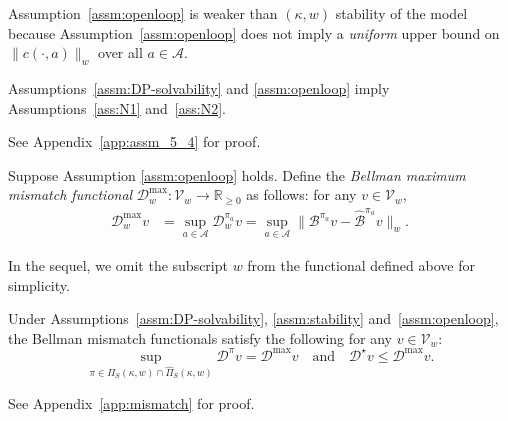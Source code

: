 \documentclass[letterpaper, 10pt]{IEEEtran}
\newcommand*\ALPHABET{\mathcal}
\newcommand*\reals{\mathds{R}}
\newcommand*\BELLMAN{\mathscr{B}}
\newcommand*\MISMATCH{\mathscr{D}}
\newcommand*\tuple{\kappa, w}
\begin{document}
Assumption~\ref{assm:openloop} is weaker than $(\kappa, w)$ stability of the model because Assumption~\ref{assm:openloop} does not imply a \emph{uniform} upper bound on $\| c(\cdot,a)\|_w$ over all $a \in \ALPHABET A$.

\begin{lemma}\label{lem:assm_5_4}
    Assumptions~\ref{assm:DP-solvability} and \ref{assm:openloop} imply Assumptions~\ref{ass:N1} and~\ref{ass:N2}.
\end{lemma}
See Appendix~\ref{app:assm_5_4} for proof.

 \begin{definition}\label{def:openloop}
     Suppose Assumption \ref{assm:openloop} holds. Define the \emph{Bellman maximum mismatch functional} $\MISMATCH^{\max}_w \colon \ALPHABET V_w \to \reals_{\ge 0}$  as follows: for any $v \in \ALPHABET V_w$, 
     \begin{align*}
         \MISMATCH_w^{\max}v 
         &= \sup_{a \in \ALPHABET A} \MISMATCH^{\pi_a}_w v
         = \sup_{a \in  \ALPHABET A} \| \BELLMAN^{\pi_a}v - \hat{\BELLMAN}^{\pi_a}v \|_w .
     \end{align*}
\end{definition}
In the sequel, we omit the subscript $w$ from the functional defined above for simplicity.

 \begin{lemma}\label{lem:mismatch}
    Under Assumptions~\ref{assm:DP-solvability}, \ref{assm:stability} and~\ref{assm:openloop}, the  Bellman mismatch functionals satisfy the following for any $v \in \ALPHABET V_w$:
        \begin{equation}\label{eq:mismatch-reln}
            \sup_{\pi \in \Pi_S(\tuple) \cap \hat \Pi_S(\tuple)} \MISMATCH^\pi v = \MISMATCH^{\max} v
            \quad\text{and}\quad
            \MISMATCH^\star v \le \MISMATCH^{\max} v.
        \end{equation}
\end{lemma}
See Appendix~\ref{app:mismatch} for proof.
\end{document}
